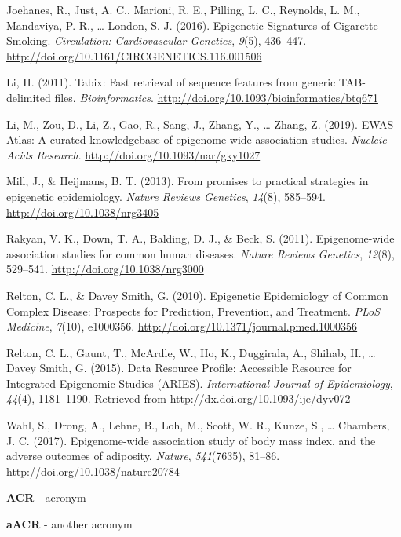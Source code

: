 \documentclass[11pt,twoside]{bristolthesis}
\newlength{\cslhangindent}
\newenvironment{cslreferences}%
  {\setlength{\parindent}{0pt}%
  \everypar{\setlength{\hangindent}{\cslhangindent}}\ignorespaces}%
  {\par}
\begin{document}
\begin{cslreferences}
\leavevmode\hypertarget{ref-Joehanes2016}{}%
Joehanes, R., Just, A. C., Marioni, R. E., Pilling, L. C., Reynolds, L. M., Mandaviya, P. R., \ldots{} London, S. J. (2016). Epigenetic Signatures of Cigarette Smoking. \emph{Circulation: Cardiovascular Genetics}, \emph{9}(5), 436--447. \url{http://doi.org/10.1161/CIRCGENETICS.116.001506}

\leavevmode\hypertarget{ref-Li2011}{}%
Li, H. (2011). Tabix: Fast retrieval of sequence features from generic TAB-delimited files. \emph{Bioinformatics}. \url{http://doi.org/10.1093/bioinformatics/btq671}

\leavevmode\hypertarget{ref-Li2019}{}%
Li, M., Zou, D., Li, Z., Gao, R., Sang, J., Zhang, Y., \ldots{} Zhang, Z. (2019). EWAS Atlas: A curated knowledgebase of epigenome-wide association studies. \emph{Nucleic Acids Research}. \url{http://doi.org/10.1093/nar/gky1027}

\leavevmode\hypertarget{ref-Mill2013}{}%
Mill, J., \& Heijmans, B. T. (2013). From promises to practical strategies in epigenetic epidemiology. \emph{Nature Reviews Genetics}, \emph{14}(8), 585--594. \url{http://doi.org/10.1038/nrg3405}

\leavevmode\hypertarget{ref-Rakyan2011}{}%
Rakyan, V. K., Down, T. A., Balding, D. J., \& Beck, S. (2011). Epigenome-wide association studies for common human diseases. \emph{Nature Reviews Genetics}, \emph{12}(8), 529--541. \url{http://doi.org/10.1038/nrg3000}

\leavevmode\hypertarget{ref-Relton2010}{}%
Relton, C. L., \& Davey Smith, G. (2010). Epigenetic Epidemiology of Common Complex Disease: Prospects for Prediction, Prevention, and Treatment. \emph{PLoS Medicine}, \emph{7}(10), e1000356. \url{http://doi.org/10.1371/journal.pmed.1000356}

\leavevmode\hypertarget{ref-Relton2015}{}%
Relton, C. L., Gaunt, T., McArdle, W., Ho, K., Duggirala, A., Shihab, H., \ldots{} Davey Smith, G. (2015). Data Resource Profile: Accessible Resource for Integrated Epigenomic Studies (ARIES). \emph{International Journal of Epidemiology}, \emph{44}(4), 1181--1190. Retrieved from \url{http://dx.doi.org/10.1093/ije/dyv072}

\leavevmode\hypertarget{ref-Wahl2017}{}%
Wahl, S., Drong, A., Lehne, B., Loh, M., Scott, W. R., Kunze, S., \ldots{} Chambers, J. C. (2017). Epigenome-wide association study of body mass index, and the adverse outcomes of adiposity. \emph{Nature}, \emph{541}(7635), 81--86. \url{http://doi.org/10.1038/nature20784}
\end{cslreferences}
  \begin{abbreviations}
    \textbf{ACR} - acronym

    \textbf{aACR} - another acronym
  \end{abbreviations}
\end{document}
